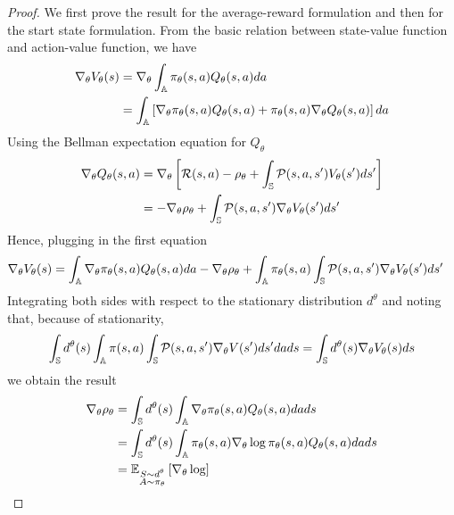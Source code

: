 \begin{proof}
	We first prove the result for the average-reward formulation and then for the start state formulation. From the basic relation between state-value function and action-value function, we have
	\begin{equation*}
		\begin{split}
			\nabla_\theta V_\theta(s) &= \nabla_\theta \int_{\A} \pi_\theta(s,a) Q_\theta(s,a) da\\
				&= \int_{\A} \left[ \nabla_\theta \pi_\theta(s,a) Q_\theta(s,a) + \pi_\theta(s,a) \nabla_\theta Q_\theta(s,a)\right] da
		\end{split}
	\end{equation*} 
	Using the Bellman expectation equation for $Q_\theta$ 
	\begin{equation*}
		\begin{split}
			\nabla_\theta Q_\theta(s,a) &= \nabla_\theta \left[ \calR(s,a) - \rho_\theta + \int_{\S} \calP(s,a,s') V_\theta(s') ds' \right]\\
			&= -\nabla_\theta \rho_\theta + \int_{\S} \calP(s,a,s') \nabla_\theta V_\theta(s') ds'
		\end{split}
	\end{equation*}
	Hence, plugging in the first equation 
	\begin{equation*}
		\begin{split}
			\nabla_\theta V_\theta(s) &= \int_{\A} \nabla_\theta \pi_\theta(s,a) Q_\theta(s,a) da - \nabla_\theta \rho_\theta + \int_\A \pi_\theta(s,a) \int_{\S} \calP(s,a,s') \nabla_\theta V_\theta(s') ds' 
		\end{split}
	\end{equation*} 	
	Integrating both sides with respect to the stationary distribution $d^\theta$ and noting that, because of stationarity,  
	\begin{equation*}
		\int_{\S} d^\theta(s) \int_{\A} \pi(s,a) \int_{\S} \calP(s,a,s') \nabla_\theta V(s') ds' da ds = \int_{\S} d^\theta(s) \nabla_\theta V_\theta(s) ds
	\end{equation*}
	we obtain the result 
	\begin{equation*}
		\begin{split}
		\nabla_\theta \rho_\theta &= \int_{\S} d^\theta(s) \int_{\A} \nabla_\theta \pi_\theta(s,a) Q_\theta(s,a) da ds\\
		&= \int_{\S} d^\theta(s) \int_{\A} \pi_\theta(s,a) \nabla_\theta \log\pi_\theta(s,a) Q_\theta(s,a) da ds\\
		&= \E[\substack{S \sim d^\theta\\A \sim \pi_\theta}]{\nabla_\theta\log
}
\end{split}
\end{equation*}
\end{proof}
